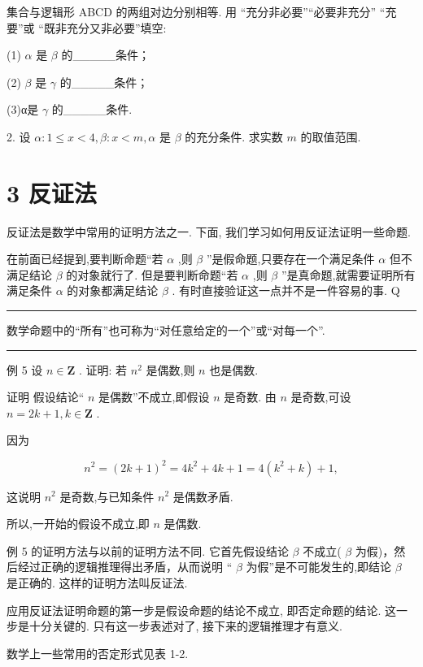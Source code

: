 \documentclass[10pt]{article}
\newcommand{\HRule}{\begin{center}\rule{0.9\linewidth}{0.2mm}\end{center}}
\begin{document}
集合与逻辑形 ABCD 的两组对边分别相等. 用 “充分非必要”“必要非充分” “充要”或 “既非充分又非必要”填空:

(1) \(\alpha\) 是 \(\beta\) 的\_\_\_\_\_条件；

(2) \(\beta\) 是 \(\gamma\) 的\_\_\_\_\_条件；

(3)α是 \(\gamma\) 的\_\_\_\_\_条件.

2. 设 \(\alpha  : 1 \leq  x < 4,\beta  : x < m,\alpha\) 是 \(\beta\) 的充分条件. 求实数 \(m\) 的取值范围.

\section*{3 反证法}

反证法是数学中常用的证明方法之一. 下面, 我们学习如何用反证法证明一些命题.

在前面已经提到,要判断命题“若 \(\alpha\) ,则 \(\beta\) ”是假命题,只要存在一个满足条件 \(\alpha\) 但不满足结论 \(\beta\) 的对象就行了. 但是要判断命题“若 \(\alpha\) ,则 \(\beta\) ”是真命题,就需要证明所有满足条件 \(\alpha\) 的对象都满足结论 \(\beta\) . 有时直接验证这一点并不是一件容易的事. Q

\HRule

数学命题中的“所有”也可称为“对任意给定的一个”或“对每一个”.

\HRule

例 5 设 \(n \in  \mathbf{Z}\) . 证明: 若 \({n}^{2}\) 是偶数,则 \(n\) 也是偶数.

证明 假设结论“ \(n\) 是偶数”不成立,即假设 \(n\) 是奇数. 由 \(n\) 是奇数,可设 \(n = {2k} + 1,k \in  \mathbf{Z}\) .

因为

\[
{n}^{2} = {\left( 2k + 1\right) }^{2} = 4{k}^{2} + {4k} + 1 = 4\left( {{k}^{2} + k}\right)  + 1,
\]

这说明 \({n}^{2}\) 是奇数,与已知条件 \({n}^{2}\) 是偶数矛盾.

所以,一开始的假设不成立,即 \(n\) 是偶数.

例 5 的证明方法与以前的证明方法不同. 它首先假设结论 \(\beta\) 不成立( \(\beta\) 为假)，然后经过正确的逻辑推理得出矛盾，从而说明 “ \(\beta\) 为假”是不可能发生的,即结论 \(\beta\) 是正确的. 这样的证明方法叫反证法.

应用反证法证明命题的第一步是假设命题的结论不成立, 即否定命题的结论. 这一步是十分关键的. 只有这一步表述对了, 接下来的逻辑推理才有意义.

数学上一些常用的否定形式见表 1-2.
\end{document}
